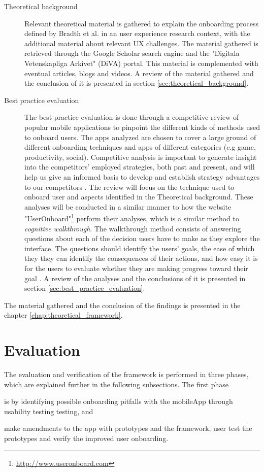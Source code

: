 \begin{description}
  \item [Theoretical background] Relevant theoretical material is gathered to explain the onboarding process defined by Bradth et al. \cite{Bradt2009} in an user experience research context, with the additional material about relevant UX challenges. The material gathered is retrieved through the Google Scholar search engine and the "Digitala Vetenskapliga Arkivet" (DiVA) portal. This material is complemented with eventual articles, blogs and videos. A review of the material gathered and the conclusion of it is presented in section \ref{sec:theoretical_background}.
  \item [Best practice evaluation] The best practice evaluation is done through a competitive review \cite{Schade2013} of popular mobile applications to pinpoint the different kinds of methods used to onboard users. The apps analyzed are chosen to cover a large ground of different onboarding techniques and apps of different categories (e.g game, productivity, social). Competitive analysis is important to generate insight into the competitors' employed strategies, both past and present, and will help us give an informed basis to develop and establish strategy advantages to our competitors \cite{Wilson2010}. The review will focus on the technique used to onboard user and aspects identified in the Theoretical background. These analyses will be conducted in a similar manner to how the website "UserOnboard"\footnote{\url{http://www.useronboard.com}} perform their analyses, which is a similar method to \textit{cognitive walkthrough}. The walkthrough method consists of answering questions about each of the decision users have to make as they explore the interface. The questions should identify the users' goals, the ease of which they they can identify the consequences of their actions, and how easy it is for the users to evaluate whether they are making progress toward their goal \cite{Lewis1990}. A review of the analyses and the conclusions of it is presented in section \ref{sec:best_practice_evaluation}.
\end{description}
The material gathered and the conclusion of the findings is presented in the chapter \ref{chap:theoretical_framework}.

\section{Evaluation}
\label{sec:evaluation}
The evaluation and verification of the framework is performed in three phases, which are explained further in the following subsections. The first phase \begin{enumerate*}[label=(\(\arabic*\))]
  \item is by identifying possible onboarding pitfalls with the mobileApp through usability testing testing, and
  \item make amendments to the app with prototypes and the framework, user test the prototypes and verify the improved user onboarding.
\end{enumerate*}

